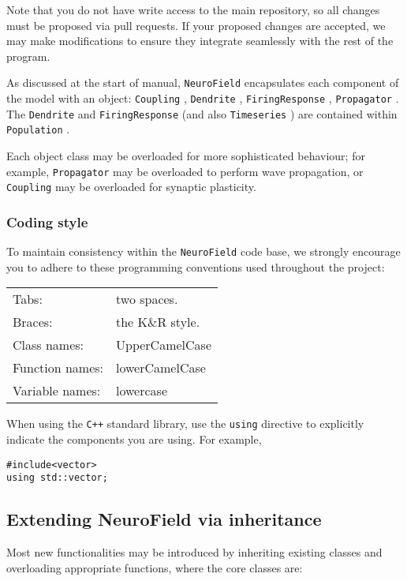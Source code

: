 \documentclass[12pt,a4paper]{article}
\newcommand{\type}[1]{{\small\small\tt #1} }
\newcommand{\NF}[0]{\type{NeuroField}}
\begin{document}
Note that you do not have write access to the main repository, so all changes must be proposed via pull requests. If your proposed changes are accepted, we may make modifications to ensure they integrate seamlessly with the rest of the program.

As discussed at the start of manual, \NF encapsulates each component of the model with an object: \type{Coupling}, \type{Dendrite}, \type{FiringResponse}, \type{Propagator}. The \type{Dendrite} and \type{FiringResponse} (and also \type{Timeseries}) are contained within \type{Population}.

Each object class may be overloaded for more sophisticated behaviour; for example, \type{Propagator} may be overloaded to perform wave propagation, or \type{Coupling} may be overloaded for synaptic plasticity.

\subsubsection{Coding style}

To maintain consistency within the \NF code base, we strongly encourage you to adhere to these programming conventions used throughout the project:

\begin{tabular}{ l l }
    Tabs:& two spaces.\\
    Braces:& the K\&R style.\\
    Class names:&UpperCamelCase\\
    Function names:&lowerCamelCase\\
    Variable names:&lowercase
\end{tabular}

When using the \type{C++} standard library, use the \type{using} directive to explicitly indicate the components you are using. For example,

\begin{lstlisting}
#include<vector>
using std::vector;
\end{lstlisting}

\subsection{Extending NeuroField via inheritance}
\label{sec:extension}

Most new functionalities may be introduced by inheriting existing classes and overloading appropriate functions, where the core classes are:
\end{document}
